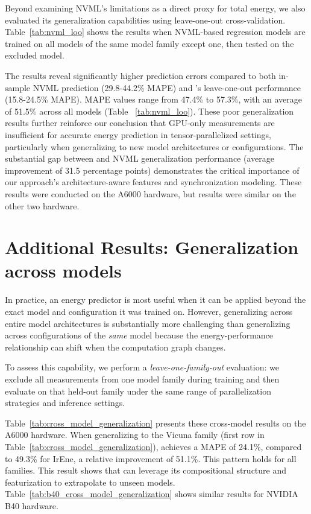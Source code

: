 Beyond examining NVML's limitations as a direct proxy for total energy, we also evaluated its generalization capabilities using leave-one-out cross-validation. Table~\ref{tab:nvml_loo} shows the results when NVML-based regression models are trained on all models of the same model family except one, then tested on the excluded model.

The results reveal significantly higher prediction errors compared to both in-sample NVML prediction (29.8-44.2\% MAPE) and \sys{}'s leave-one-out performance (15.8-24.5\% MAPE). MAPE values range from 47.4\% to 57.3\%, with an average of 51.5\% across all models (Table ~\ref{tab:nvml_loo}). These poor generalization results further reinforce our conclusion that GPU-only measurements are insufficient for accurate energy prediction in tensor-parallelized settings, particularly when generalizing to new model architectures or configurations. The substantial gap between \sys{} and NVML generalization performance (average improvement of 31.5 percentage points) demonstrates the critical importance of our approach's architecture-aware features and synchronization modeling. These results were conducted on the A6000 hardware, but results were similar on the other two hardware. 


\section{Additional Results: Generalization across models}
\label{app:additional-generalization-models}

In practice, an energy predictor is most useful when it can be applied beyond the exact model and configuration it was trained on.
However, generalizing across entire model architectures is substantially more challenging than generalizing across configurations of the \emph{same} model because the energy-performance relationship can shift when the computation graph changes. 

To assess this capability, we perform a \emph{leave-one-family-out} evaluation: we exclude all measurements from one model family during training and then evaluate \sys{} on that held-out family under the same range of parallelization strategies and inference settings. 

Table~\ref{tab:cross_model_generalization} presents these cross-model results on the A6000 hardware.
When generalizing to the Vicuna family (first row in Table~\ref{tab:cross_model_generalization}), \sys{} achieves a MAPE of 24.1\%, compared to 49.3\% for IrEne, a relative improvement of 
51.1\%.
This pattern holds for all families. This result shows that \sys{} can leverage its compositional structure and featurization to extrapolate to unseen models. Table~\ref{tab:b40_cross_model_generalization} shows similar results for NVIDIA B40 hardware.

